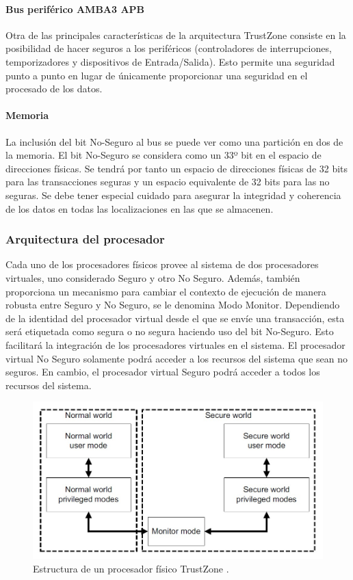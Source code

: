 \paragraph{Bus periférico AMBA3 APB}

Otra de las principales características de la arquitectura TrustZone consiste en la posibilidad de hacer seguros a los periféricos (controladores de interrupciones, temporizadores y dispositivos de Entrada/Salida). Esto permite una seguridad punto a punto en lugar de únicamente proporcionar una seguridad en el procesado de los datos.

\paragraph{Memoria}

La inclusión del bit No-Seguro al bus se puede ver como una partición en dos de la memoria. El bit No-Seguro se considera como un 33º bit en el espacio de direcciones físicas. Se tendrá por tanto un espacio de direcciones físicas de 32 bits para las transacciones seguras y un espacio equivalente de 32 bits para las no seguras. Se debe tener especial cuidado para asegurar la integridad y coherencia de los datos en todas las localizaciones en las que se almacenen.

\subsubsection{Arquitectura del procesador}
Cada uno de los procesadores físicos provee al sistema de dos procesadores virtuales, uno considerado Seguro y otro No Seguro. Además, también proporciona un mecanismo para cambiar el contexto de ejecución de manera robusta entre Seguro y No Seguro, se le denomina Modo Monitor. Dependiendo de la identidad del procesador virtual desde el que se envíe una transacción, esta será etiquetada como segura o no segura haciendo uso del bit No-Seguro. Esto facilitará la integración de los procesadores virtuales en el sistema. El procesador virtual No Seguro solamente podrá acceder a los recursos del sistema que sean no seguros. En cambio, el procesador virtual Seguro podrá acceder a todos los recursos del sistema.


\begin{figure}
	\centering
	\includegraphics[width=1\textwidth]{imagenes/monitor.jpg}
	\caption{\label{fig1}Estructura de un procesador físico TrustZone \cite{trustzone}.}
\end{figure}


